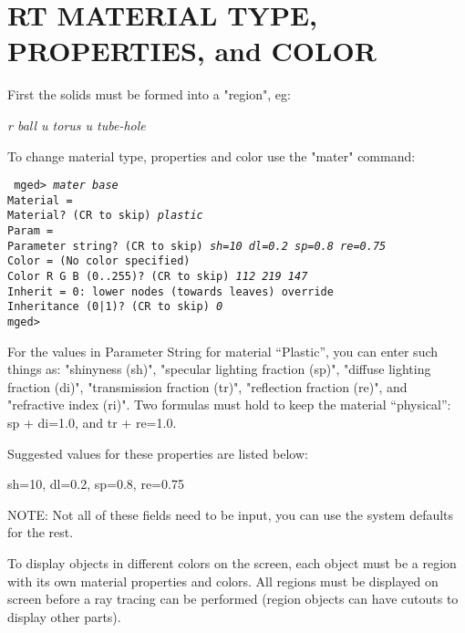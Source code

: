 \chapter{RT MATERIAL TYPE, PROPERTIES, and COLOR}

First the solids must be formed into a "region", eg:
       
{\em\center
r ball u torus u tube-hole
}

To change material type, properties and color use the "mater" command:

{\tt
mged> {\em mater base} \\
Material = \\
Material?  (CR to skip) {\em plastic} \\
Param = \\
Parameter string? (CR to skip) {\em sh=10 dl=0.2 sp=0.8 re=0.75} \\
Color = (No color specified) \\
Color R G B (0..255)? (CR to skip) {\em 112 219 147} \\
Inherit = 0:  lower nodes (towards leaves) override \\
Inheritance (0|1)? (CR to skip) {\em 0} \\
mged> \\
}

For the values in Parameter String for material ``Plastic'',
you can enter such things as:
"shinyness (sh)",
"specular lighting fraction (sp)",
"diffuse lighting fraction (di)",
"transmission fraction (tr)",
"reflection fraction (re)", and
"refractive index (ri)".
Two formulas must hold to keep the material ``physical'':
sp + di=1.0, and tr + re=1.0.

Suggested values for these properties are listed below:

{\center sh=10, dl=0.2, sp=0.8, re=0.75}

NOTE:  Not all of these fields need to be input, you
can use the system defaults for the rest.

To display objects in different colors on the screen, each object must
be a region with its own material properties and colors.  All regions must be
displayed on screen before a ray tracing can be performed (region objects can
have cutouts to display other parts).

